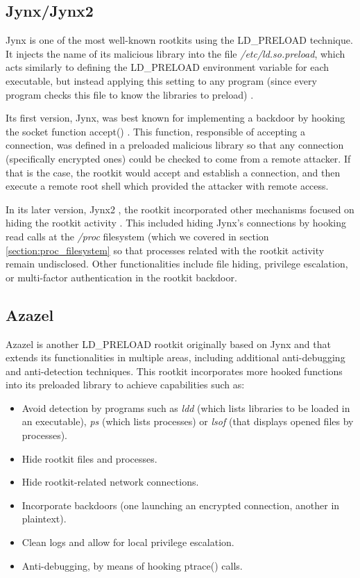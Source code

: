 \subsection{Jynx/Jynx2} Jynx \cite{jynx_github} is one of the most
well-known rootkits using the LD\_PRELOAD technique. It injects the name of
its malicious library into the file \textit{/etc/ld.so.preload}, which acts
similarly to defining the LD\_PRELOAD environment variable for each
executable, but instead applying this setting to any program (since every
program checks this file to know the libraries to preload)
\cite{ldpreload_so_jynx}.

Its first version, Jynx, was best known for implementing a backdoor by
hooking the socket function accept() \cite{ldpreload_pros_2327}. This
function, responsible of accepting a connection, was defined in a preloaded
malicious library so that any connection (specifically encrypted ones)
could be checked to come from a remote attacker. If that is the case, the
rootkit would accept and establish a connection, and then execute a remote
root shell which provided the attacker with remote access.

In its later version, Jynx2 \cite{jynx2_github}, the rootkit incorporated
other mechanisms focused on hiding the rootkit activity
\cite{jynx2_infosecinstitute}. This included hiding Jynx's connections by
hooking read calls at the \textit{/proc} filesystem (which we covered in
section \ref{section:proc_filesystem} so that processes related with the
rootkit activity remain undisclosed. Other functionalities include file
hiding, privilege escalation, or multi-factor authentication in the rootkit
backdoor.

\subsection{Azazel}
Azazel is another LD\_PRELOAD rootkit originally based on Jynx and that
extends its functionalities in multiple areas, including additional
anti-debugging and anti-detection techniques. This rootkit incorporates
more hooked functions into its preloaded library to achieve capabilities
such as:
\begin{itemize}
\item Avoid detection by programs such as \textit{ldd} (which lists
libraries to be loaded in an executable), \textit{ps} (which lists
processes) or \textit{lsof} (that displays opened files by processes).
\item Hide rootkit files and processes.
\item Hide rootkit-related network connections.
\item Incorporate backdoors (one launching an encrypted connection, another in plaintext).
\item Clean logs and allow for local privilege escalation.
\item Anti-debugging, by means of hooking ptrace() calls.
\end{itemize}

